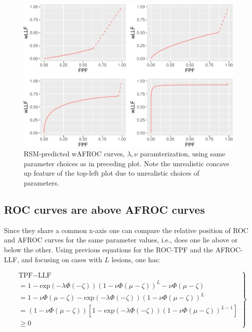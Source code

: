 \documentclass[
]{book}
\begin{document}
\begin{figure}
\centering
\includegraphics{08-rsm-predictions2_files/figure-latex/rsm-other-predictions-wafroc-plots-lambda-nu-1.pdf}
\caption{\label{fig:rsm-other-predictions-wafroc-plots-lambda-nu}RSM-predicted wAFROC curves, \(\lambda, \nu\) paramterization, using same parameter choices as in preceding plot. Note the unrealistic concave up feature of the top-left plot due to unrealistic choices of parameters.}
\end{figure}

\hypertarget{rsm-other-predictions-roc-above-afroc}{%
\subsection{ROC curves are above AFROC curves}\label{rsm-other-predictions-roc-above-afroc}}

Since they share a common x-axis one can compare the relative position of ROC and AFROC curves for the same parameter values, i.e., does one lie above or below the other. Using previous equations for the ROC-TPF and the AFROC-LLF, and focusing on cases with \(L\) lesions, one has:

\begin{equation}
\left.
\begin{aligned}
& \text{TPF}-\text{LLF} \\
&= 1 - \text{exp}\left ( - \lambda \Phi \left ( - \zeta \right )\right )
\left ( 1 - \nu \Phi \left ( \mu - \zeta \right ) \right )^L - \nu  \Phi \left ( \mu - \zeta \right )\\
&= 1 - \nu  \Phi \left ( \mu - \zeta \right )- \text{exp}\left ( - \lambda \Phi \left ( - \zeta \right )\right )
\left ( 1  - \nu \Phi \left ( \mu - \zeta \right ) \right )^L \\
&= \left( 1 - \nu  \Phi \left ( \mu - \zeta \right ) \right)\left[ 1 - \text{exp}\left ( - \lambda \Phi \left ( - \zeta \right )\right ) 
\left ( 1  - \nu \Phi \left ( \mu - \zeta \right ) \right )^{L-1}  \right]\\
& \ge0
\end{aligned}
\right \}
\label{eq:rsm-predictions-roc-above-afroc}
\end{equation}
\end{document}
